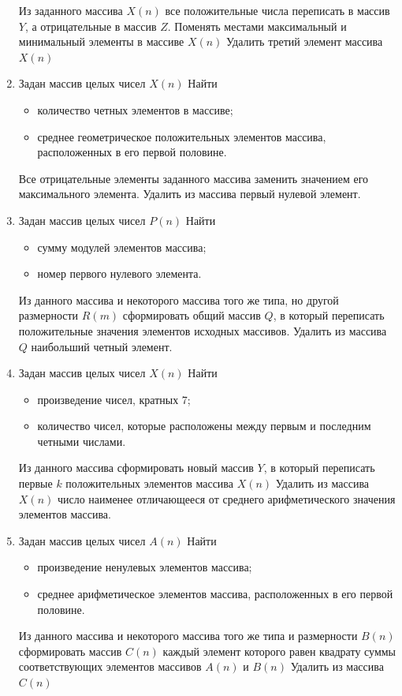 \begin{enumerate}
Из заданного массива $X(n)$ все положительные числа переписать в массив
$Y$, а отрицательные в массив $Z$. Поменять местами максимальный и минимальный элементы
в массиве $X(n)$ Удалить третий элемент массива $X(n)$
\item Задан массив целых чисел $X(n)$ Найти
\begin{itemize}
\item количество четных элементов в массиве;
\item среднее геометрическое положительных элементов массива, расположенных в его первой половине.
\end{itemize}
Все отрицательные элементы заданного массива заменить значением его максимального элемента. Удалить из массива
первый нулевой элемент.
\item Задан массив целых чисел $P(n)$ Найти
\begin{itemize}
\item сумму модулей элементов массива;
\item номер первого нулевого элемента.
\end{itemize}
Из данного массива и некоторого массива того же типа, но другой размерности $R(m)$
сформировать общий массив $Q$, в который переписать положительные значения элементов исходных массивов. Удалить
из массива $Q$ наибольший четный элемент.
\item Задан массив целых чисел $X(n)$ Найти
\begin{itemize}
\item произведение чисел, кратных 7;
\item количество чисел, которые расположены между первым и последним четными числами.
\end{itemize}
Из данного массива сформировать новый массив $Y$, в который переписать первые $k$
положительных элементов массива $X(n)$ Удалить из массива $X(n)$
число наименее отличающееся от среднего арифметического значения элементов массива.
\item Задан массив целых чисел $A(n)$ Найти
\begin{itemize}
\item произведение ненулевых элементов массива;
\item среднее арифметическое элементов массива, расположенных в его первой половине.
\end{itemize}
Из данного массива и некоторого массива того же типа и размерности $B(n)$ сформировать
массив $C(n)$ каждый элемент которого равен квадрату суммы соответствующих элементов массивов
$A(n)$ и $B(n)$ Удалить из массива $C(n)$

\end{enumerate}

